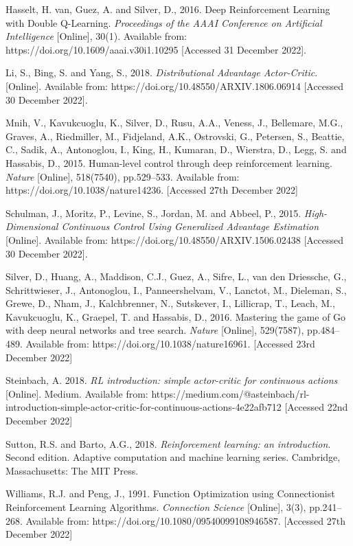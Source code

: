 \documentclass{article}
\begin{document}
Hasselt, H. van, Guez, A. and Silver, D., 2016. Deep Reinforcement Learning with Double Q-Learning. \emph{Proceedings of the AAAI Conference on Artificial Intelligence} [Online], 30(1). Available from: https://doi.org/10.1609/aaai.v30i1.10295 [Accessed 31 December 2022].

Li, S., Bing, S. and Yang, S., 2018. \emph{Distributional Advantage Actor-Critic}. [Online]. Available from: https://doi.org/10.48550/ARXIV.1806.06914 [Accessed 30 December 2022].

Mnih, V., Kavukcuoglu, K., Silver, D., Rusu, A.A., Veness, J., Bellemare, M.G., Graves, A., Riedmiller, M., Fidjeland, A.K., Ostrovski, G., Petersen, S., Beattie, C., Sadik, A., Antonoglou, I., King, H., Kumaran, D., Wierstra, D., Legg, S. and Hassabis, D., 2015. Human-level control through deep reinforcement learning. \emph{Nature} [Online], 518(7540), pp.529–533. Available from: https://doi.org/10.1038/nature14236. [Accessed 27th December 2022]

Schulman, J., Moritz, P., Levine, S., Jordan, M. and Abbeel, P., 2015. \emph{High-Dimensional Continuous Control Using Generalized Advantage Estimation}  [Online]. Available from: https://doi.org/10.48550/ARXIV.1506.02438 [Accessed 30 December 2022].

Silver, D., Huang, A., Maddison, C.J., Guez, A., Sifre, L., van den Driessche, G., Schrittwieser, J., Antonoglou, I., Panneershelvam, V., Lanctot, M., Dieleman, S., Grewe, D., Nham, J., Kalchbrenner, N., Sutskever, I., Lillicrap, T., Leach, M., Kavukcuoglu, K., Graepel, T. and Hassabis, D., 2016. Mastering the game of Go with deep neural networks and tree search. \emph{Nature} [Online], 529(7587), pp.484–489. Available from: https://doi.org/10.1038/nature16961. [Accessed 23rd December 2022]

Steinbach, A. 2018. \emph{RL introduction: simple actor-critic for continuous actions} [Online]. Medium. Available from: https://medium.com/@asteinbach/rl-introduction-simple-actor-critic-for-continuous-actions-4e22afb712 [Accessed 22nd December 2022]

Sutton, R.S. and Barto, A.G., 2018. \emph{Reinforcement learning: an introduction}. Second edition. Adaptive computation and machine learning series. Cambridge, Massachusetts: The MIT Press.

Williams, R.J. and Peng, J., 1991. Function Optimization using Connectionist Reinforcement Learning Algorithms. \emph{Connection Science} [Online], 3(3), pp.241–268. Available from: https://doi.org/10.1080/09540099108946587. [Accessed 27th December 2022]
\end{document}
